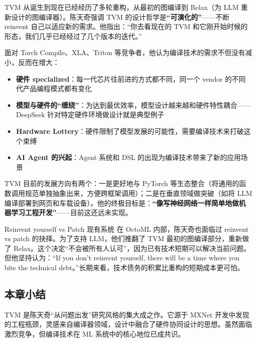 TVM 从诞生到现在已经经历了多轮重构，从最初的图编译到 Relax（为 LLM 重新设计的图编译器）。陈天奇强调 TVM 的设计哲学是\textbf{``可演化的''}------不断 reinvent 自己以适应新的需求。他指出：``你去看现在的 TVM 和它刚开始时候的形态，我们几乎已经经过了几个版本的迭代。''

面对 Torch Compile、XLA、Triton 等竞争者，他认为编译技术的需求不但没有减小，反而在增大：

\begin{itemize}
    \item \textbf{硬件 specialized}：每一代芯片往前进的方式都不同，同一个 vendor 的不同代产品编程模式都有变化
    \item \textbf{模型与硬件的``缠绕''}：为达到最优效率，模型设计越来越和硬件特性耦合------DeepSeek 针对特定硬件环境做设计就是典型例子
    \item \textbf{Hardware Lottery}：硬件限制了模型发展的可能性，需要编译技术来打破这个束缚
    \item \textbf{AI Agent 的兴起}：Agent 系统和 DSL 的出现为编译技术带来了新的应用场景
\end{itemize}

TVM 目前的发展方向有两个：一是更好地与 PyTorch 等生态整合（将通用的函数调用规范单独抽象出来，方便跨框架调用）；二是在垂直领域做突破（如将 LLM 编译部署到网页和车载设备）。他的终极目标是：\textbf{``像写神经网络一样简单地做机器学习工程开发''}------目前这还远未实现。

\begin{warningbox}{Reinvent yourself vs Patch 现有系统}
在 OctoML 内部，陈天奇也面临过 reinvent vs patch 的抉择。为了支持 LLM，他们推翻了 TVM 最初的图编译部分，重新做了 Relax。这个决定``不会被所有人认可''，因为已有技术短期可以解决当前问题。但他坚持认为：``If you don't reinvent yourself, there will be a time where you bite the technical debt。''长期来看，技术债务的积累比重构的短期成本更可怕。
\end{warningbox}

\subsection{本章小结}

TVM 是陈天奇``从问题出发''研究风格的集大成之作。它源于 MXNet 开发中发现的工程瓶颈，灵感来自编译器领域，设计中融合了硬件协同设计的思想。虽然面临激烈竞争，但编译技术在 ML 系统中的核心地位已成共识。

